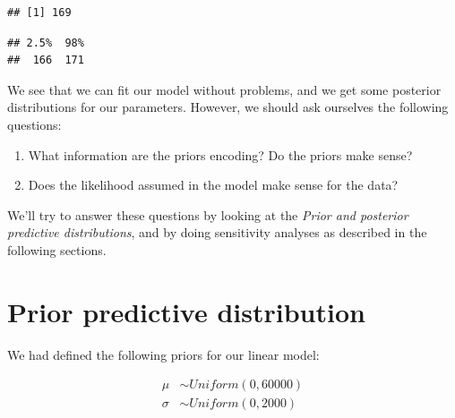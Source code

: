 \documentclass[12pt,]{krantz}
\newenvironment{Shaded}{\begin{snugshade}}{\end{snugshade}}
\newcommand{\FloatTok}[1]{\textcolor[rgb]{0.00,0.00,0.81}{#1}}
\newcommand{\KeywordTok}[1]{\textcolor[rgb]{0.13,0.29,0.53}{\textbf{#1}}}
\newcommand{\NormalTok}[1]{#1}
\newcommand{\OperatorTok}[1]{\textcolor[rgb]{0.81,0.36,0.00}{\textbf{#1}}}
\newcommand{\StringTok}[1]{\textcolor[rgb]{0.31,0.60,0.02}{#1}}
\providecommand{\tightlist}{%
  \setlength{\itemsep}{0pt}\setlength{\parskip}{0pt}}
\theoremstyle{definition}
\theoremstyle{definition}
\theoremstyle{definition}
\theoremstyle{remark}
\begin{document}
\begin{Shaded}
\end{Shaded}

\begin{verbatim}
## [1] 169
\end{verbatim}

\begin{Shaded}
\end{Shaded}

\begin{verbatim}
## 2.5%  98% 
##  166  171
\end{verbatim}

We see that we can fit our model without problems, and we get some
posterior distributions for our parameters. However, we should ask ourselves the following questions:

\begin{enumerate}
\def\labelenumi{\arabic{enumi}.}
\tightlist
\item
  What information are the priors encoding? Do the priors make sense?
\item
  Does the likelihood assumed in the model make sense for the data?
\end{enumerate}

We'll try to answer these questions by looking at the \emph{Prior and posterior predictive distributions}, and by doing sensitivity analyses as described in the following sections.

\hypertarget{sec:priorpred}{%
\section{Prior predictive distribution}\label{sec:priorpred}}

We had defined the following priors for our linear model:

\begin{equation}
\begin{aligned}
\mu &\sim Uniform(0, 60000) \\
\sigma &\sim Uniform(0, 2000) 
\end{aligned}
\label{eq:rtpriorsrepeated}
\end{equation}
\end{document}
